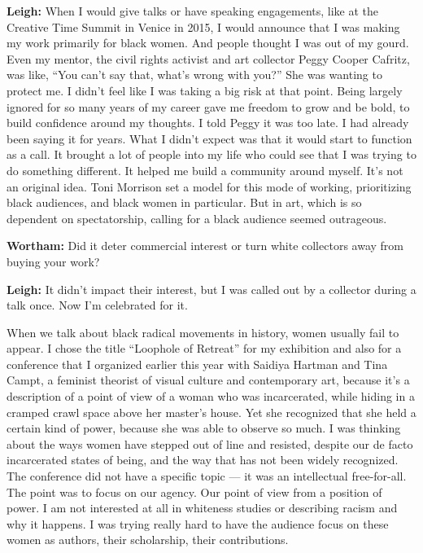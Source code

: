 \textbf{Leigh:} When I would give talks or have speaking engagements,
like at the Creative Time Summit in Venice in 2015, I would announce
that I was making my work primarily for black women. And people thought
I was out of my gourd. Even my mentor, the civil rights activist and art
collector Peggy Cooper Cafritz, was like, ``You can't say that, what's
wrong with you?'' She was wanting to protect me. I didn't feel like I
was taking a big risk at that point. Being largely ignored for so many
years of my career gave me freedom to grow and be bold, to build
confidence around my thoughts. I told Peggy it was too late. I had
already been saying it for years. What I didn't expect was that it would
start to function as a call. It brought a lot of people into my life who
could see that I was trying to do something different. It helped me
build a community around myself. It's not an original idea. Toni
Morrison set a model for this mode of working, prioritizing black
audiences, and black women in particular. But in art, which is so
dependent on spectatorship, calling for a black audience seemed
outrageous.

\textbf{Wortham:} Did it deter commercial interest or turn white
collectors away from buying your work?

\textbf{Leigh:} It didn't impact their interest, but I was called out by
a collector during a talk once. Now I'm celebrated for it.

When we talk about black radical movements in history, women usually
fail to appear. I chose the title ``Loophole of Retreat'' for my
exhibition and also for a conference that I organized earlier this year
with Saidiya Hartman and Tina Campt, a feminist theorist of visual
culture and contemporary art, because it's a description of a point of
view of a woman who was incarcerated, while hiding in a cramped crawl
space above her master's house. Yet she recognized that she held a
certain kind of power, because she was able to observe so much. I was
thinking about the ways women have stepped out of line and resisted,
despite our de facto incarcerated states of being, and the way that has
not been widely recognized. The conference did not have a specific topic
--- it was an intellectual free-for-all. The point was to focus on our
agency. Our point of view from a position of power. I am not interested
at all in whiteness studies or describing racism and why it happens. I
was trying really hard to have the audience focus on these women as
authors, their scholarship, their contributions.

